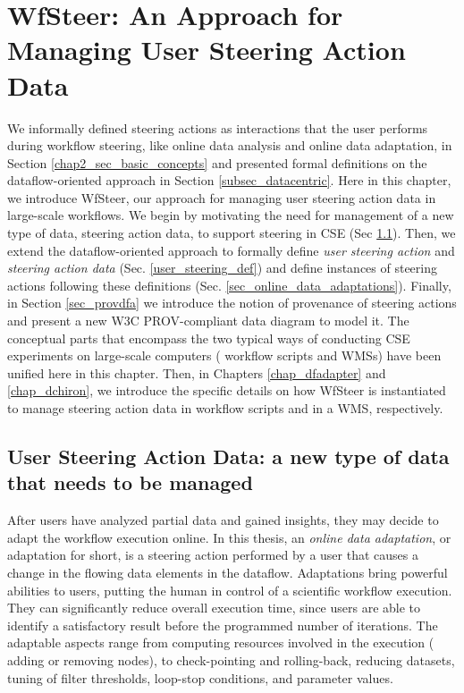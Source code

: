 \chapter{WfSteer: An Approach for Managing User Steering Action Data} \label{chap4}

We informally defined steering actions as interactions that the user performs during workflow steering, like online data analysis and online data adaptation, in Section \ref{chap2_sec_basic_concepts} and presented formal definitions on the dataflow-oriented approach in Section \ref{subsec_datacentric}.
Here in this chapter, we introduce WfSteer, our approach for managing user steering action data in large-scale workflows.
We begin by motivating the need for management of a new type of data, steering action data, to support steering in CSE (Sec \ref{sec_steering_action_data}).
Then, we extend the dataflow-oriented approach to formally define \textit{user steering action} and \textit{steering action data} 
(Sec. \ref{user_steering_def}) and define instances of steering actions following these definitions
(Sec. \ref{sec_online_data_adaptations}). 
Finally, in Section \ref{sec_provdfa} we introduce the notion of provenance of steering actions  and present a new W3C PROV-compliant data diagram to model it.
The conceptual parts that encompass the two typical ways of conducting CSE experiments on large-scale computers (\ie{} workflow scripts and WMSs) have been unified here in this chapter.
Then, in Chapters \ref{chap_dfadapter} and \ref{chap_dchiron}, we introduce the specific details on how WfSteer is instantiated to manage steering action data in workflow scripts and in a WMS, respectively.



\section{User Steering Action Data: a new type of data that needs to be managed}
\label{sec_steering_action_data}

After users have analyzed partial data and gained insights,
they may decide to adapt the workflow execution online.
In this thesis, an \textit{online data adaptation}, or adaptation for short,
is a steering action performed by a user that causes a change
in the flowing data elements in the dataflow.
Adaptations bring powerful abilities to users, putting the human in control of a scientific workflow execution.
They can significantly reduce overall execution time, since users are able to identify a satisfactory result before the programmed number of iterations.
The adaptable aspects range from computing resources involved in the execution (\eg{} adding or removing nodes), to check-pointing and rolling-back, reducing datasets, tuning of filter thresholds, loop-stop conditions, and parameter values.


